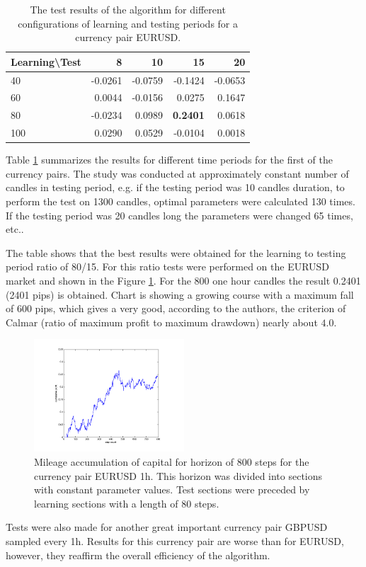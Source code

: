 \documentclass[runningheads,a4paper]{llncs}
\begin{document}
\begin{table}[h!]
\centering
\caption{The test results of the algorithm for different configurations of learning and testing periods for a currency pair EURUSD.}
\label{tab:tab1}
\begin{tabular}{|l|r|r|r|r|} \hline
Learning\textbackslash Test &	8	 &	10 &		15	 &	20 \\ \hline
40 &		-0.0261 &		-0.0759	 &	-0.1424	 &	-0.0653 \\ \hline
60 &		0.0044 &		-0.0156 &		0.0275 &		0.1647 \\ \hline
80 &		-0.0234 &		0.0989 &		\textbf{0.2401} &		0.0618 \\ \hline
100	 &	0.0290 &		0.0529 &		-0.0104	 &	0.0018 \\ \hline
\end{tabular}
\end{table}
\FloatBarrier
Table \ref{tab:tab1} summarizes the results for different time periods for the first of the currency pairs. The study was conducted at approximately constant number of candles in testing period, e.g. if the testing period was 10 candles duration, to perform the test on 1300 candles, optimal parameters were calculated 130 times. If the testing period was 20 candles long the parameters were changed 65 times, etc..

The table shows that the best results were obtained for the learning to testing period ratio of 80/15. For this ratio tests were performed on the EURUSD market and shown in the Figure \ref{fig:fig8}. For the 800 one hour candles the result 0.2401 (2401 pips) is obtained. Chart is showing a growing course with a maximum fall of 600 pips, which gives a very good, according to the authors, the criterion of Calmar (ratio of maximum profit to maximum drawdown) nearly about $4.0$.\\

\begin{figure}[h!]
\centering
\includegraphics[width = 0.5\textwidth]{figures/rys8.png}
\caption{Mileage accumulation of capital for horizon of 800 steps for the currency pair EURUSD 1h. This horizon was divided into sections with constant parameter values. Test sections were preceded by learning sections with a length of 80 steps.}
\label{fig:fig8}
\end{figure}
\FloatBarrier
Tests were also made for another great important currency pair GBPUSD sampled every 1h. Results for this currency pair are worse than for EURUSD, however, they reaffirm the overall efficiency of the algorithm.\\
\end{document}
